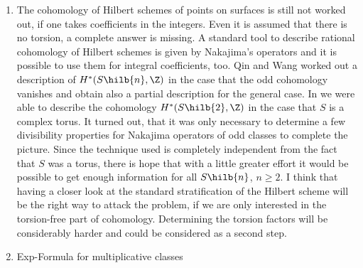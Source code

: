 \begin{enumerate}
\item The cohomology of Hilbert schemes of points on surfaces is still not worked out, if one takes coefficients in the integers. Even it is assumed that there is no torsion, a complete answer is missing. A standard tool to describe rational cohomology of Hilbert schemes is given by Nakajima's operators and it is possible to use them for integral coefficients, too. Qin and Wang worked out a description of $H^*(S\hilb{n},\Z)$ in the case that the odd cohomology vanishes and obtain also a partial description for the general case. In \cite{GS} we were able to describe the cohomology $H^*(S\hilb{2},\Z)$ in the case that $S$ is a complex torus. It turned out, that it was only necessary to determine a few divisibility properties for Nakajima operators of odd classes to complete the picture. Since the technique used is completely independent from the fact that $S$ was a torus, there is hope that with a little greater effort it would be possible to get enough information for all $S\hilb{n}$, $n\geq 2$. I think that having a closer look at the standard stratification of the Hilbert scheme will be the right way to attack the problem, if we are only interested in the torsion-free part of cohomology. 
Determining the torsion factors will be considerably harder and could be considered as a second step.

\item Exp-Formula for multiplicative classes
\end{enumerate}
